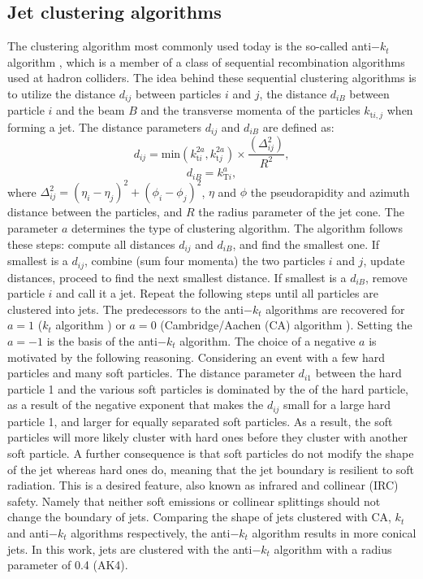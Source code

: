 \subsection*{Jet clustering algorithms}
\noindent\justify
The clustering algorithm most commonly used today is the so-called anti$-k_t$ algorithm \cite{Cacciari:2008gp}, which is a member of a class of sequential recombination algorithms used at hadron colliders. 
The idea behind these sequential clustering algorithms is to utilize the distance $d_{ij}$ between particles $i$ and $j$, the distance $d_{iB}$ between particle $i$ and the beam $B$ and the transverse momenta of the particles $k_{\mathrm{t}i,j}$ when forming a jet. 
The distance parameters $d_{ij}$ and $d_{iB}$ are defined as:
\begin{equation}
d_{ij}=\mathrm{min}(k_{\mathrm{t}i}^{2a}, k_{\mathrm{t}j}^{2a})\times\frac{(\Delta_{ij}^{2})}{R^{2}},
\end{equation}
\begin{equation}
d_{iB}=k_{\mathrm{T}i}^{a},
\end{equation}
where $\Delta_{ij}^{2}=(\eta_{i}-\eta_{j})^{2}+(\phi_{i}-\phi_{j})^{2}$, $\eta$ and $\phi$ the pseudorapidity and azimuth distance between the particles, and $R$ the radius parameter of the jet cone.
The parameter $a$ determines the type of clustering algorithm. 
The algorithm follows these steps: compute all distances $d_{ij}$ and $d_{iB}$, and find the smallest one. 
If smallest is a $d_{ij}$, combine (sum four momenta) the two particles $i$ and $j$, update distances, proceed to find the next smallest distance. 
If smallest is a $d_{iB}$, remove particle $i$ and call it a jet. Repeat the following steps until all particles are clustered into jets. 
The predecessors to the anti$-k_t$ algorithms are recovered for $a=1$ ($k_{t}$ algorithm \cite{Salam:2009jx}) or $a=0$ (Cambridge/Aachen (CA) algorithm \cite{Dokshitzer:1997in}).  
Setting the $a=-1$ is the basis of the anti$-k_t$ algorithm. 
The choice of a negative $a$ is motivated by the following reasoning. 
Considering an event with a few hard particles and many soft particles. 
The distance parameter $d_{i1}$ between the hard particle 1 and the various soft particles is dominated by the \pt of the hard particle, as a result of the negative exponent that makes the $d_{ij}$ small for a large \pt hard particle 1, and larger for equally separated soft particles. 
As a result, the soft particles will more likely cluster with hard ones before they cluster with another soft particle. 
A further consequence is that soft particles do not modify the shape of the jet whereas hard ones do, meaning that the jet boundary is resilient to soft radiation. 
This is a desired feature, also known as infrared and collinear (IRC) safety. Namely that neither soft emissions or collinear splittings should not change the boundary of jets. 
Comparing the shape of jets clustered with CA, $k_t$ and anti$-k_t$ algorithms respectively, the anti$-k_t$ algorithm results in more conical jets.
In this work, jets are clustered with the anti$-k_t$ algorithm with a radius parameter of 0.4 (AK4). 

